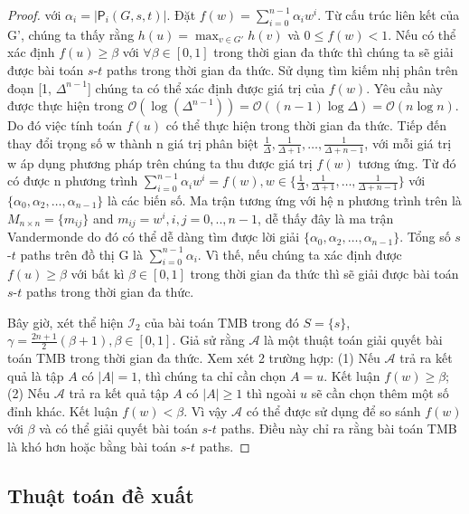 \begin{proof}
	với $\alpha_i=|\mathsf{P}_i(G, s, t)|$. Đặt $f(w)=\sum_{i=0}^{n-1}\alpha_i w^i$. Từ cấu trúc liên kết của G', chúng ta thấy rằng $h(u)=\max_{v \in G'}h(v)$ và $0 \leq  f(w) < 1$. Nếu có thể xác định $f(u) \geq \beta$ với $\forall \beta \in [0, 1]$ trong thời gian đa thức thì chúng ta sẽ giải được bài toán $s$-$t$ paths trong thời gian đa thức. Sử dụng tìm kiếm nhị phân trên đoạn [1, $\Delta^{n-1}$] chúng ta có thể xác định được giá trị của $f(w)$. Yêu cầu này được thực hiện trong $\mathcal{O}(\log(\Delta^{n-1}))=\mathcal{O}((n-1)\log\Delta) =\mathcal{O}(n\log n)$. Do đó việc tính toán $f(u)$ có thể thực hiện trong thời gian đa thức. Tiếp đến thay đổi trọng số w thành n giá trị phân biệt $\frac{1}{\Delta}, \frac{1}{\Delta+1}, \ldots, \frac{1}{\Delta+n-1}$, với mỗi giá trị w áp dụng phương pháp trên chúng ta thu được giá trị $f(w)$ tương ứng. Từ đó có được n phương trình $\sum_{i=0}^{n-1}\alpha_i w^i =f(w), w \in \{\frac{1}{\Delta}, \frac{1}{\Delta+1}, \ldots, \frac{1}{\Delta+n-1} \}$ với $\{\alpha_0, \alpha_2, \ldots, \alpha_{n-1}\}$ là các biến số. Ma trận tương ứng với hệ n phương trình trên là $M_{n \times n}=\{m_{ij}\}$ and $m_{ij}=w^{i} , i,j=0,..,n-1$, dễ thấy đây là ma trận Vandermonde do đó có thể dễ dàng tìm được lời giải $\{\alpha_0, \alpha_2, \ldots, \alpha_{n-1}\}$. Tổng số $s$-$t$ paths trên đồ thị G là $\sum_{i=0}^{n-1} \alpha_i$. Vì thế, nếu chúng ta xác định được $f(u) \geq \beta$ với bất kì $\beta \in [0, 1]$ trong thời gian đa thức thì sẽ giải được bài toán $s$-$t$ paths trong thời gian đa thức. 
	
	Bây giờ, xét thể hiện $\mathcal{I}_2$ của bài toán TMB trong đó $S=\{s\}$, $\gamma = \frac{2n+1}{2}(\beta+ 1) , \beta \in [0, 1]$.  Giả sử rằng $\mathcal{A}$ là một thuật toán giải quyết bài toán TMB trong thời gian đa thức. Xem xét 2 trường hợp: (1) Nếu $\mathcal{A}$ trả ra kết quả là tập $A$ có $|A|=1$, thì chúng ta chỉ cần chọn $A={u}$. Kết luận $f(w) \geq \beta$; (2) Nếu $\mathcal{A}$ trả ra kết quả tập $A$ có $|A| \ge 1$ thì ngoài $u$ sẽ cần chọn thêm một số đỉnh khác. Kết luận $f(w) < \beta$. Vì vậy $\mathcal{A}$ có thể được sử dụng để so sánh $f(w)$ với $\beta$ và có thể giải quyết bài toán $s$-$t$ paths. Điều này chỉ ra rằng bài toán TMB là khó hơn hoặc bằng bài toán $s$-$t$ paths.
\end{proof}
\subsection{Thuật toán đề xuất}
